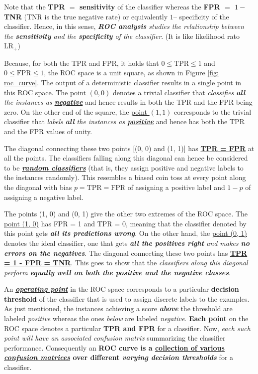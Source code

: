 \documentclass[11pt]{article}
\begin{document}
Note that the \textbf{TPR $=$ sensitivity} of the classifier whereas the \textbf{FPR $=$ $1-$TNR} (TNR is the true negative rate) or equivalently
$1 –$ specificity of the classifier. Hence, in this sense, \emph{\textbf{ROC analysis} studies the relationship between the \textbf{sensitivity} and the \textbf{specificity} of the classifier}. (It is like likelihood rato $\text{LR}_{+}$)

Because, for both the TPR and FPR, it holds that $0 \le \text{TPR} \le 1$ and $0 \le \text{FPR} \le 1$, the ROC space is a unit square, as shown in Figure \ref{fig: roc_curve}. The output of a deterministic classifier results in a single point in this ROC space. The \underline{point $(0, 0)$} denotes a trivial classifier that \emph{classifies \textbf{all} the instances as \underline{\textbf{negative}}} and hence results in both the TPR and the FPR being zero. On the other end of the square, the \underline{point $(1, 1)$} corresponds to the trivial classifier that \emph{labels \textbf{all} the instances as \underline{\textbf{positive}}} and hence has both the TPR and the FPR values of unity.

The diagonal connecting these two points [(0, 0) and (1, 1)] has \underline{\textbf{TPR = FPR}} at all the points. The classifiers falling along this diagonal can hence be considered
to be \underline{\emph{\textbf{random classifiers}}} (that is, they assign positive and negative labels to the instances randomly). This resembles a biased coin toss at every point along the diagonal with bias $p = \text{TPR} = \text{FPR}$ of assigning a positive label and $1 - p$ of assigning a negative label. 

The points (1, 0) and (0, 1) give the other two extremes of the ROC space. The \underline{point (1, 0)} has FPR = 1 and TPR = 0, meaning that the classifier denoted by this point gets \emph{\textbf{all its predictions wrong}}. On the other hand, the \underline{point (0, 1)} denotes the ideal classifier, one that gets \emph{\textbf{all the positives right} and makes \textbf{no errors on the negatives}}. The diagonal connecting these two points has \underline{\textbf{TPR = 1 - FPR = TNR}}. This goes to show that the \emph{classifiers along this diagonal perform \textbf{equally well on both the positive and the negative classes}}.

An \underline{\emph{\textbf{operating point}}} in the ROC space corresponds to a particular \textbf{decision threshold} of the classifier that is used to assign discrete labels to the examples. As just mentioned, the instances achieving a score \emph{\textbf{above}} the threshold are labeled \emph{positive} whereas the ones \emph{below} are labeled \emph{negative}. \textbf{Each point} on the ROC space denotes a particular \textbf{TPR and FPR} for a classifier. Now,\emph{ each such point will have an associated confusion matrix} summarizing the classifier performance. Consequently an \textbf{ROC curve is a \underline{collection of various \emph{confusion matrices}} over different \emph{varying decision thresholds}} for a classifier.
\end{document}
